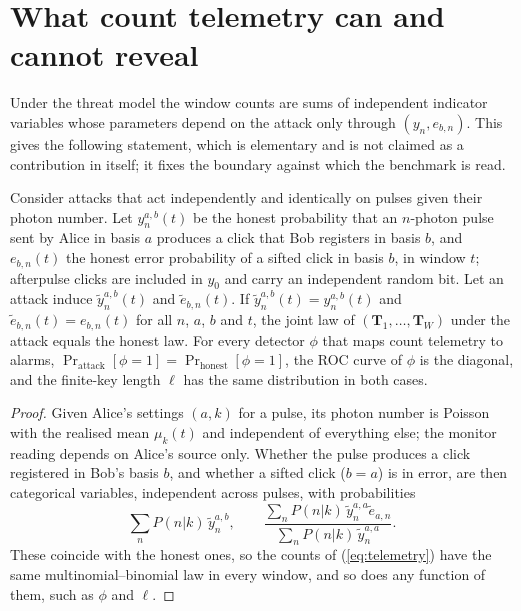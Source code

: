 \section{What count telemetry can and cannot reveal}\label{sec:limits}

Under the threat model the window counts are sums of independent indicator variables whose parameters depend on the attack only through $(y_n,e_{b,n})$. This gives the following statement, which is elementary and is not claimed as a contribution in itself; it fixes the boundary against which the benchmark is read.

\begin{proposition}\label{prop:indist}
Consider attacks that act independently and identically on pulses given their photon number. Let $y_n^{a,b}(t)$ be the honest probability that an $n$-photon pulse sent by Alice in basis $a$ produces a click that Bob registers in basis $b$, and $e_{b,n}(t)$ the honest error probability of a sifted click in basis $b$, in window $t$; afterpulse clicks are included in $y_0$ and carry an independent random bit. Let an attack induce $\tilde y_n^{a,b}(t)$ and $\tilde e_{b,n}(t)$. If $\tilde y_n^{a,b}(t)=y_n^{a,b}(t)$ and $\tilde e_{b,n}(t)=e_{b,n}(t)$ for all $n$, $a$, $b$ and $t$, the joint law of $(\mathbf{T}_1,\dots,\mathbf{T}_W)$ under the attack equals the honest law. For every detector $\phi$ that maps count telemetry to alarms, $\Pr_{\mathrm{attack}}[\phi=1]=\Pr_{\mathrm{honest}}[\phi=1]$, the ROC curve of $\phi$ is the diagonal, and the finite-key length $\ell$ has the same distribution in both cases.
\end{proposition}

\begin{proof}
Given Alice's settings $(a,k)$ for a pulse, its photon number is Poisson with the realised mean $\mu_k(t)$ and independent of everything else; the monitor reading depends on Alice's source only. Whether the pulse produces a click registered in Bob's basis $b$, and whether a sifted click ($b=a$) is in error, are then categorical variables, independent across pulses, with probabilities
\begin{equation*}
\sum_n P(n|k)\,\tilde y^{a,b}_n,\qquad \frac{\sum_n P(n|k)\,\tilde y^{a,a}_n\tilde e_{a,n}}{\sum_n P(n|k)\,\tilde y^{a,a}_n}.
\end{equation*} These coincide with the honest ones, so the counts of (\ref{eq:telemetry}) have the same multinomial--binomial law in every window, and so does any function of them, such as $\phi$ and $\ell$.
\end{proof}

